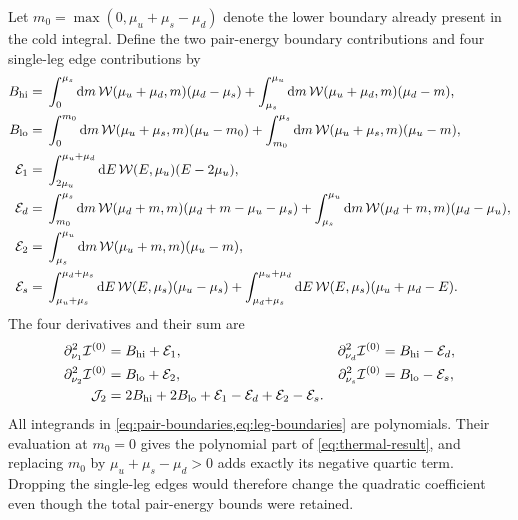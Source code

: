 Let \(m_0=\max(0,\mu_u+\mu_s-\mu_d)\) denote the lower boundary already present in the cold integral.
Define the two pair-energy boundary contributions and four single-leg edge contributions by
\begin{align}
 B_{\rm hi}={}&\int_0^{\mu_s}\mathrm d m\,\mathcal W(\mu_u+\mu_d,m)(\mu_d-\mu_s)
 +\int_{\mu_s}^{\mu_u}\mathrm d m\,\mathcal W(\mu_u+\mu_d,m)(\mu_d-m),\notag\\
 B_{\rm lo}={}&\int_0^{m_0}\mathrm d m\,\mathcal W(\mu_u+\mu_s,m)(\mu_u-m_0)
 +\int_{m_0}^{\mu_s}\mathrm d m\,\mathcal W(\mu_u+\mu_s,m)(\mu_u-m),
 \label{eq:pair-boundaries}\\
 \mathcal E_1={}&\int_{2\mu_u}^{\mu_u+\mu_d}\mathrm d E\,\mathcal W(E,\mu_u)(E-2\mu_u),\notag\\
 \mathcal E_d={}&\int_{m_0}^{\mu_s}\mathrm d m\,\mathcal W(\mu_d+m,m)(\mu_d+m-\mu_u-\mu_s)
 +\int_{\mu_s}^{\mu_u}\mathrm d m\,\mathcal W(\mu_d+m,m)(\mu_d-\mu_u),\notag\\
 \mathcal E_2={}&\int_{\mu_s}^{\mu_u}\mathrm d m\,\mathcal W(\mu_u+m,m)(\mu_u-m),\notag\\
 \mathcal E_s={}&\int_{\mu_u+\mu_s}^{\mu_d+\mu_s}\mathrm d E\,\mathcal W(E,\mu_s)(\mu_u-\mu_s)
 +\int_{\mu_d+\mu_s}^{\mu_u+\mu_d}\mathrm d E\,\mathcal W(E,\mu_s)(\mu_u+\mu_d-E).
 \label{eq:leg-boundaries}
\end{align}
The four derivatives and their sum are
\begin{align}
 \partial_{\nu_1}^2\mathcal I^{(0)}&=B_{\rm hi}+\mathcal E_1,&
 \partial_{\nu_d}^2\mathcal I^{(0)}&=B_{\rm hi}-\mathcal E_d,\notag\\
 \partial_{\nu_2}^2\mathcal I^{(0)}&=B_{\rm lo}+\mathcal E_2,&
 \partial_{\nu_s}^2\mathcal I^{(0)}&=B_{\rm lo}-\mathcal E_s,\notag\\
 \mathcal J_2&=2B_{\rm hi}+2B_{\rm lo}+\mathcal E_1-\mathcal E_d+\mathcal E_2-\mathcal E_s.
 \label{eq:thermal-boundary-sum}
\end{align}
All integrands in \cref{eq:pair-boundaries,eq:leg-boundaries} are polynomials.
Their evaluation at \(m_0=0\) gives the polynomial part of \cref{eq:thermal-result}, and replacing \(m_0\) by \(\mu_u+\mu_s-\mu_d>0\) adds exactly its negative quartic term.
Dropping the single-leg edges would therefore change the quadratic coefficient even though the total pair-energy bounds were retained.


